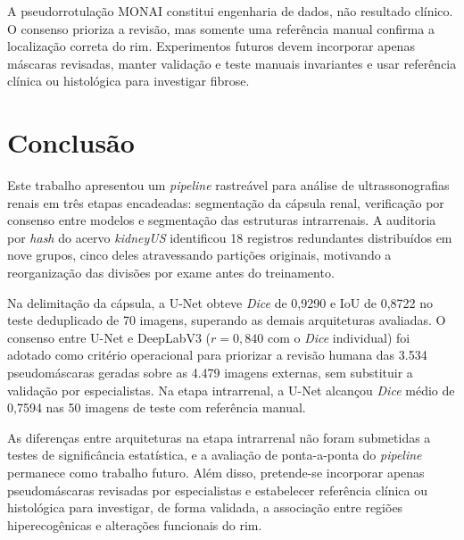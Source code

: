 \documentclass[12pt]{article}
\begin{document}
A pseudorrotulação MONAI constitui engenharia de dados, não resultado clínico. O consenso prioriza a revisão, mas somente uma referência manual confirma a localização correta do rim. Experimentos futuros devem incorporar apenas máscaras revisadas, manter validação e teste manuais invariantes e usar referência clínica ou histológica para investigar fibrose.

\section{Conclusão}

Este trabalho apresentou um \textit{pipeline} rastreável para análise de ultrassonografias
renais em três etapas encadeadas: segmentação da cápsula renal, verificação por
consenso entre modelos e segmentação das estruturas intrarrenais. A auditoria por
\textit{hash} do acervo \textit{kidneyUS} identificou 18 registros redundantes distribuídos
em nove grupos, cinco deles atravessando partições originais, motivando a
reorganização das divisões por exame antes do treinamento.

Na delimitação da cápsula, a U-Net obteve \textit{Dice} de 0,9290 e IoU de 0,8722 no
teste deduplicado de 70 imagens, superando as demais arquiteturas avaliadas. O
consenso entre U-Net e DeepLabV3 ($r = 0{,}840$ com o \textit{Dice} individual) foi adotado
como critério operacional para priorizar a revisão humana das 3.534 pseudomáscaras
geradas sobre as 4.479 imagens externas, sem substituir a validação por
especialistas. Na etapa intrarrenal, a U-Net alcançou \textit{Dice} médio de 0,7594 nas
50 imagens de teste com referência manual.

As diferenças entre arquiteturas na etapa intrarrenal não foram submetidas a
testes de significância estatística, e a avaliação de ponta-a-ponta do \textit{pipeline}
permanece como trabalho futuro. Além disso, pretende-se incorporar
apenas pseudomáscaras revisadas por especialistas e estabelecer referência clínica
ou histológica para investigar, de forma validada, a associação entre regiões
hiperecogênicas e alterações funcionais do rim.

\end{document}
